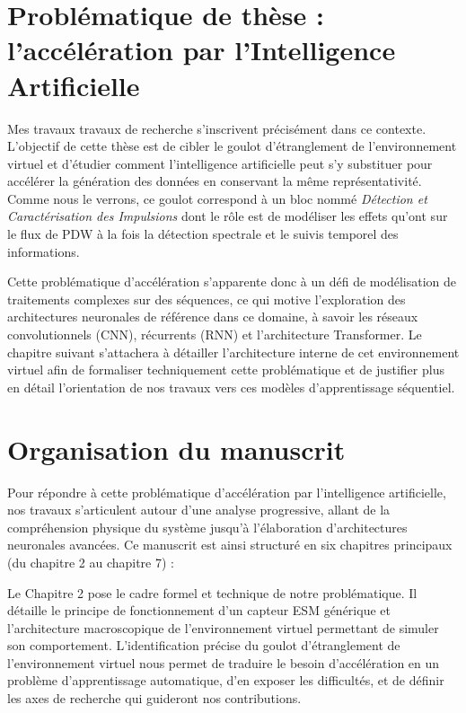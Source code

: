 \section{Problématique de thèse : l'accélération par l'Intelligence Artificielle}

Mes travaux travaux de recherche s'inscrivent précisément dans ce contexte. L'objectif de cette thèse est de cibler le goulot d'étranglement de l'environnement virtuel et d'étudier comment l'intelligence artificielle peut s'y substituer pour accélérer la génération des données en conservant la même représentativité. Comme nous le verrons, ce goulot correspond à un bloc nommé \textit{Détection et Caractérisation des Impulsions} dont le rôle est de modéliser les effets qu'ont sur le flux de PDW à la fois la détection spectrale et le suivis temporel des informations. 

Cette problématique d'accélération s'apparente donc à un défi de modélisation de traitements complexes sur des séquences, ce qui motive l'exploration des architectures neuronales de référence dans ce domaine, à savoir les réseaux convolutionnels (CNN), récurrents (RNN) et l'architecture Transformer. Le chapitre suivant s'attachera à détailler l'architecture interne de cet environnement virtuel afin de formaliser techniquement cette problématique et de justifier plus en détail l'orientation de nos travaux vers ces modèles d'apprentissage séquentiel.

\section{Organisation du manuscrit}
Pour répondre à cette problématique d'accélération par l'intelligence artificielle, nos travaux s'articulent autour d'une analyse progressive, allant de la compréhension physique du système jusqu'à l'élaboration d'architectures neuronales avancées. Ce manuscrit est ainsi structuré en six chapitres principaux (du chapitre 2 au chapitre 7) :

Le Chapitre 2 pose le cadre formel et technique de notre problématique. Il détaille le principe de fonctionnement d'un capteur ESM générique et l'architecture macroscopique de l'environnement virtuel permettant de simuler son comportement. L'identification précise du goulot d'étranglement de l'environnement virtuel nous permet de traduire le besoin d'accélération en un problème d'apprentissage automatique, d'en exposer les difficultés, et de définir les axes de recherche qui guideront nos contributions.

